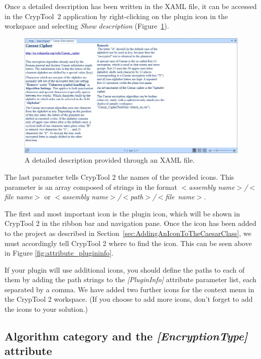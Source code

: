 Once a detailed description has been written in the XAML file, it can be accessed in the CrypTool~2 application by right-clicking on the plugin icon in the workspace and selecting \textit{Show description} (Figure~\ref{fig:xaml_description}).

\begin{figure}
	\centering
		\includegraphics[width=1.00\textwidth]{figures/xaml_description.jpg}
	\caption{A detailed description provided through an XAML file.}
	\label{fig:xaml_description}
\end{figure}

The last parameter tells CrypTool 2 the names of the provided icons. This parameter is an array composed of strings in the format \textit{$<$assembly name$>$/$<$file name$>$} or \textit{$<$assembly name$>$/$<$path$>$/\linebreak $<$file~name$>$}.

The first and most important icon is the plugin icon, which will be shown in CrypTool 2 in the ribbon bar and navigation pane. Once the icon has been added to the project as described in Section~\ref{sec:AddingAnIconToTheCaesarClass}, we must accordingly tell CrypTool 2 where to find the icon. This can be seen above in Figure \ref{fig:attribute_plugininfo}.

If your plugin will use additional icons, you should define the paths to each of them by adding the path strings to the \textit{[PluginInfo]} attribute parameter list, each separated by a comma. We have added two further icons for the context menu in the CrypTool 2 workspace. (If you choose to add more icons, don't forget to add the icons to your solution.)

\subsection{Algorithm category and the \protect\textit{[EncryptionType]} attribute}

